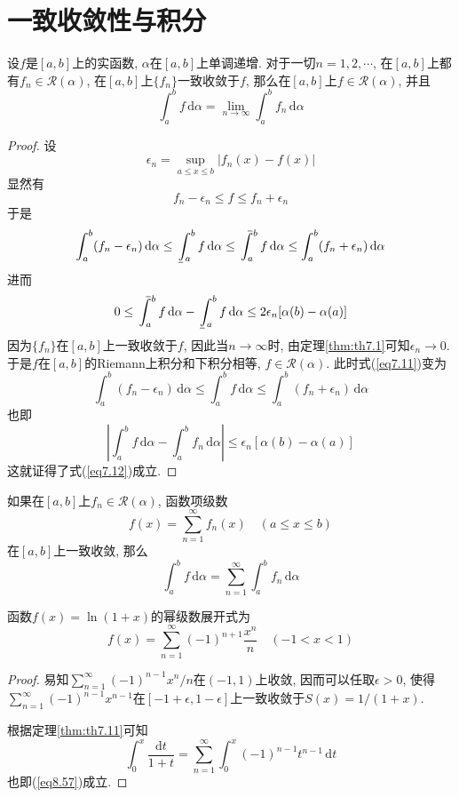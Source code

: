 \documentclass[cn,12pt,math=mtpro2,citestyle=gb7714-2015,bibstyle=gb7714-2015,twocol]{elegantbook}
\newcommand{\da}{\,\text{d}\alpha}
\newcommand{\dt}{\,\text{d}t}
\newcommand{\limn }{\lim_{n\to\infty}}
\def\upint{\mathchoice%
    {\mkern13mu\overline{\vphantom{\intop}\mkern7mu}\mkern-20mu}%
    {\mkern7mu\overline{\vphantom{\intop}\mkern7mu}\mkern-14mu}%
    {\mkern7mu\overline{\vphantom{\intop}\mkern7mu}\mkern-14mu}%
    {\mkern7mu\overline{\vphantom{\intop}\mkern7mu}\mkern-14mu}%
  \int}
\def\lowint{\mkern3mu\underline{\vphantom{\intop}\mkern7mu}\mkern-10mu\int}
\begin{document}
\section{一致收敛性与积分}
\begin{theorem}\label{thm:th7.11}
  设$f$是$[a,b]$上的实函数, $\alpha$在$[a,b]$上单调递增. 对于一切$n=1,2,\cdots$, 在$[a,b]$上都有$f_n\in\mathscr{R}(\alpha)$, 在$[a,b]$上$\{f_n\}$一致收敛于$f$, 那么在$[a,b]$上$f\in\mathscr{R}(\alpha)$, 并且
  \begin{equation}\label{eq7.12}
   \int_{a}^{b}f\da=\limn \int_{a}^{b}f_n\da
  \end{equation}
\end{theorem}
\begin{proof}
  设
  $$\epsilon_n=\sup_{a\leq x\leq b}|f_n(x)-f(x)|$$
  显然有
  $$f_n-\epsilon_n\leq f\leq f_n+\epsilon_n$$
  于是
  \begin{equation}\label{eq7.11}
    \int_{a}^{b}(f_n-\epsilon_n)\da\leq\lowint_a^b f\da\leq\upint_a^b f\da \leq\int_{a}^{b}(f_n+\epsilon_n)\da
  \end{equation}
  进而
  $$0\leq\upint_a^b f\da-\lowint_a^b f\da\leq 2\epsilon_n[\alpha(b)-\alpha(a)]$$
  因为$\{f_n\}$在$[a,b]$上一致收敛于$f$, 因此当$n\to\infty$时, 由定理\ref{thm:th7.1}可知$\epsilon_n\to0$. 于是$f$在$[a,b]$的Riemann上积分和下积分相等, $f\in\mathscr{R}(\alpha)$. 此时式(\ref{eq7.11})变为
  $$\int_{a}^{b}(f_n-\epsilon_n)\da\leq\int_a^b f\da \leq\int_{a}^{b}(f_n+\epsilon_n)\da$$
  也即
  $$\left|\int_{a}^{b}f\da-\int_{a}^{b}f_n\da\right|\leq\epsilon_n[\alpha(b)-\alpha(a)]$$
  这就证得了式(\ref{eq7.12})成立.
\end{proof}
\begin{corollary}
如果在$[a,b]$上$f_n\in\mathscr{R}(\alpha)$, 函数项级数
$$f(x)=\sum_{n=1}^{\infty}f_n(x)\quad(a\leq x\leq b)$$
在$[a,b]$上一致收敛, 那么
$$\int_{a}^{b}f\da=\sum_{n=1}^{\infty}\int_{a}^{b}f_n\da$$
\end{corollary}
\begin{example}
函数$f(x)=\ln(1+x)$的幂级数展开式为
\begin{equation}\label{eq8.57}
  f(x)=\sum_{n=1}^{\infty}(-1)^{n+1}\frac{x^n}{n}\quad(-1<x<1)
\end{equation}
\end{example}
\begin{proof}
  易知$\sum_{n=1}^{\infty}(-1)^{n-1}x^n/n$在$(-1,1)$上收敛, 因而可以任取$\epsilon>0$, 使得$\sum_{n=1}^{\infty}(-1)^{n-1}x^{n-1}$在$[-1+\epsilon,1-\epsilon]$上一致收敛于$S(x)=\displaystyle 1/(1+x)$.

  根据定理\ref{thm:th7.11}可知
  $$\int_{0}^{x}\frac{\text{d}t}{1+t}=\sum_{n=1}^{\infty}\int_{0}^{x}(-1)^{n-1}t^{n-1}\dt$$
  也即(\ref{eq8.57})成立.

\end{proof}
\end{document}
